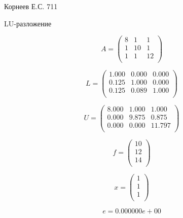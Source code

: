 \documentclass[14pt]{article}
\begin{document}
Корнеев Е.С.
711
\begin{center}
	\fontsize{16pt}{18pt}\selectfont
	LU-разложение
\end{center}

\fontsize{14pt}{16pt}\selectfont

$$
A = 
\begin{pmatrix}
8 &  1 & 1  \\
1 & 10 & 1  \\
1 &  1 & 12 \\
\end{pmatrix}
$$

$$
L = 
\begin{pmatrix}
1.000 &  0.000 &  0.000  \\
0.125 &  1.000 &  0.000  \\
0.125 &  0.089 &  1.000  \\
\end{pmatrix}
$$

$$
U = 
\begin{pmatrix}
8.000 &  1.000 &  1.000   \\
0.000 &  9.875 &  0.875   \\
0.000 &  0.000 &  11.797  \\
\end{pmatrix}
$$

$$
f = 
\begin{pmatrix}
10 \\
12 \\
14 \\
\end{pmatrix}
$$

$$
x = 
\begin{pmatrix}
1 \\
1 \\
1 \\
\end{pmatrix}
$$

$$
	e = 0.000000e+00
$$
\end{document}
